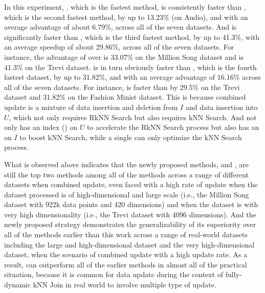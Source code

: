 In this experiment, \cpdualtree, which is the fastest method, is consistently faster than \spdualtree, which is the second fastest method, by up to 13.23\% (on Audio), and with an average advantage of about 6.79\%, across all of the seven datasets. And \spdualtree is significantly faster than \dualtree, which is the third fastest method, by up to 41.3\%, with an average speedup of about 29.86\%, across all of the seven datasets. For instance, the advantage of \spdualtree over \dualtree is 33.07\% on the Million Song dataset and is 41.3\% on the Trevi dataset. \dualtree is in turn obviously faster than \deltatree, which is the fourth fastest dataset, by up to 31.82\%, and with an average advantage of 16.16\% across all of the seven datasets. For instance, \dualtree is faster than \deltatree by 29.5\% on the Trevi dataset and 31.82\% on the Fashion Minist dataset. This is because combined update is a mixture of data insertion and deletion from $I$ and data insertion into $U$, which not only requires RkNN Search but also requires kNN Search. And \dualtree not only has an index (\hdrtree) on $U$ to accelerate the RkNN Search process but also has an \deltatree on $I$ to boost kNN Search, while a single \deltatree can only optimize the kNN Search process.

What is observed above indicates that the newly proposed methods, \cpdualtree and \spdualtree, are still the top two methods among all of the methods across a range of different datasets when combined update, even faced with a high rate of update when the dataset processed is of high-dimensional and large scale (i.e., the Million Song dataset with 922k data points and 420 dimensions) and when the dataset is with very high dimensionality (i.e., the Trevi dataset with 4096 dimensions). And the newly proposed \dualtree strategy demonstrates the generalizability of its superiority over all of the methods earlier than this work across a range of real-world datasets including the large and high-dimensional dataset and the very high-dimensional dataset, when the scenario of combined update with a high update rate. As a result, \dualtree can outperform all of the earlier methods in almost all of the practical situation, because it is common for data update during the context of fully-dynamic kNN Join in real world to involve multiple type of update.

